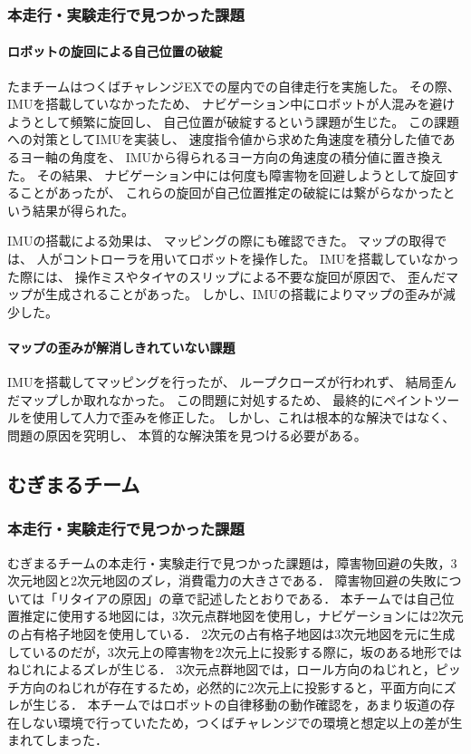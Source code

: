 \documentclass[twocolumn,9pt]{jsproceedings}
\begin{document}
\subsubsection{本走行・実験走行で見つかった課題}
\paragraph{ロボットの旋回による自己位置の破綻}


たまチームはつくばチャレンジEXでの屋内での自律走行を実施した。
その際、IMUを搭載していなかったため、
ナビゲーション中にロボットが人混みを避けようとして頻繁に旋回し、
自己位置が破綻するという課題が生じた。
この課題への対策としてIMUを実装し、
速度指令値から求めた角速度を積分した値であるヨー軸の角度を、
IMUから得られるヨー方向の角速度の積分値に置き換えた。
その結果、
ナビゲーション中には何度も障害物を回避しようとして旋回することがあったが、
これらの旋回が自己位置推定の破綻には繋がらなかったという結果が得られた。


IMUの搭載による効果は、
マッピングの際にも確認できた。
マップの取得では、
人がコントローラを用いてロボットを操作した。
IMUを搭載していなかった際には、
操作ミスやタイヤのスリップによる不要な旋回が原因で、
歪んだマップが生成されることがあった。
しかし、IMUの搭載によりマップの歪みが減少した。


\paragraph{マップの歪みが解消しきれていない課題}


IMUを搭載してマッピングを行ったが、
ループクローズが行われず、
結局歪んだマップしか取れなかった。
この問題に対処するため、
最終的にペイントツールを使用して人力で歪みを修正した。
しかし、これは根本的な解決ではなく、
問題の原因を究明し、
本質的な解決策を見つける必要がある。

\subsection{むぎまるチーム}
\subsubsection{本走行・実験走行で見つかった課題}

むぎまるチームの本走行・実験走行で見つかった課題は，障害物回避の失敗，3次元地図と2次元地図のズレ，消費電力の大きさである．
障害物回避の失敗については「リタイアの原因」の章で記述したとおりである．
本チームでは自己位置推定に使用する地図には，3次元点群地図を使用し，ナビゲーションには2次元の占有格子地図を使用している．
2次元の占有格子地図は3次元地図を元に生成しているのだが，3次元上の障害物を2次元上に投影する際に，坂のある地形ではねじれによるズレが生じる．
3次元点群地図では，ロール方向のねじれと，ピッチ方向のねじれが存在するため，必然的に2次元上に投影すると，平面方向にズレが生じる．
本チームではロボットの自律移動の動作確認を，あまり坂道の存在しない環境で行っていたため，つくばチャレンジでの環境と想定以上の差が生まれてしまった．
\end{document}
